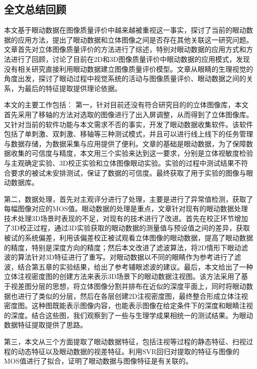 
\begin{summary}
\section{全文总结回顾}
本文基于眼动数据在图像质量评价中越来越被重视这一事实，探讨了当前的眼动数据的应用方法，提出了眼动数据和立体图像之间是否存在其他关联这一研究问题。文章首先对立体图像质量评价的方法进行了综述，特别对眼动数据的应用方式和方法进行了回顾，讨论了目前在2D和3D图像质量评价中眼动数据的应用模式，发现没有相关研究直接利用眼动数据建立图像质量评价模型。文章从眼睛的生理视觉的角度出发，探讨了眼动过程中视觉系统的活动与图像质量评价、眼动数据之间的关系，为最后的特征提取提供理论依据。

本文的主要工作包括：
第一，针对目前还没有符合研究目的的立体图像库，本文首先采用了移轴的方法对选取的图像进行了出入屏调整，从而得到了立体图像库。又针对当前的软件功能与本文需求不否的事实，开发了眼动数据收集软件。该软件包括了单刺激、双刺激、移轴等三种测试模式，并且可以进行线上线下的任务管理与数据存储，为数据采集与应用提供了便利。文章的基础是眼动数据，为了保障数据收集的可信度与精度，本文用三个实验来达到这一要求，分别是立体视敏度检验与主观确定实验、3D校正实验和立体图像眼动实验。实验的过程中测试结果不符合要求的被试未安排测试，保证了数据的可信度。最终获取了用于实验的图像与眼动数据库。

第二，数据处理，首先对主观评分进行了处理，主要是进行了异常值检测，获取了每幅图像对应的MOS值。眼动数据的处理是重点，文章针对现有的眼动数据处理技术处理3D场景时表现的不足，对现有的技术进行了改进。首先在校正环节增加了3D校正过程，通过3D实验获取的眼动数据的测量值与预设值之间的差异，获取被试的系统偏差，利用该偏差校正被试观看立体图像的眼动数据，提高了眼动数据的精度，特别是深度方向的精度；然后本文改进了滤波算法，将2D情形下眼动滤波的算法针对3D特征进行了重写。对眼动数据以不同的眼睛作为参考进行了滤波，结合第五章的实验结果，给出了参考辅眼滤波的建议。最后，本文给出了一种立体注视密度图的创建方法来表示3D场景下的眼动数据注视图。该方法采用了基于视差图分层的思想，将立体图像分割并排布在近似的深度平面上，同时将眼动数据也进行了类似的分层，然后在各层创建2D注视密度图，最终整合形成立体注视密度图。这种图既能表示图像内容，也能表示图像在给定条件下的深度和眼睛注视的深度。结合这些图，我们观察到了一些与生理学成果相统一的测试结果。为眼动数据特征提取提供了思路。

第三，本文从三个方面提取了眼动数据特征，包括注视等过程的静态特征、扫视过程的动态特征以及眼动数据的视差特征。利用SVR回归对提取的特征与图像的MOS值进行了拟合，证明了眼动数据与图像特征是有关联的。

\end{summary}
